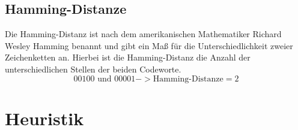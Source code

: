 \subsection{Hamming-Distanze}
Die Hamming-Distanz ist nach dem amerikanischen Mathematiker Richard Wesley Hamming benannt und gibt ein Maß für die Unterschiedlichkeit zweier Zeichenketten an. Hierbei ist die Hamming-Distanz die Anzahl der unterschiedlichen Stellen der beiden Codeworte.
\begin{equation}
00100 \text{ und } 00001 -> \text{Hamming-Distanze}= 2
\label{eq:hammingdistanze}
\end{equation}
 
\section{Heuristik}
\label{sec:Heuristik}

